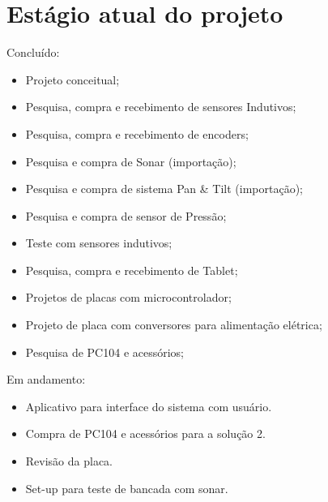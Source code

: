 


\section{Estágio atual do projeto}

Concluído:
\begin{itemize}
  \item Projeto conceitual;
  \item Pesquisa, compra e recebimento de sensores Indutivos;
  \item Pesquisa, compra e recebimento de encoders;
  \item Pesquisa e compra de Sonar (importação);
  \item Pesquisa e compra de sistema Pan \& Tilt (importação);
  \item Pesquisa e compra de sensor de Pressão;
  \item Teste com sensores indutivos;
  \item Pesquisa, compra e recebimento de Tablet;
  \item Projetos de placas com microcontrolador;
  \item Projeto de placa com conversores para alimentação elétrica;
  \item Pesquisa de PC104 e acessórios;   
\end{itemize}
Em andamento:
\begin{itemize}
  \item Aplicativo para interface do sistema com usuário.
  \item Compra de PC104 e acessórios para a solução 2.
  \item Revisão da placa.
  \item Set-up para teste de bancada com sonar.
\end{itemize}